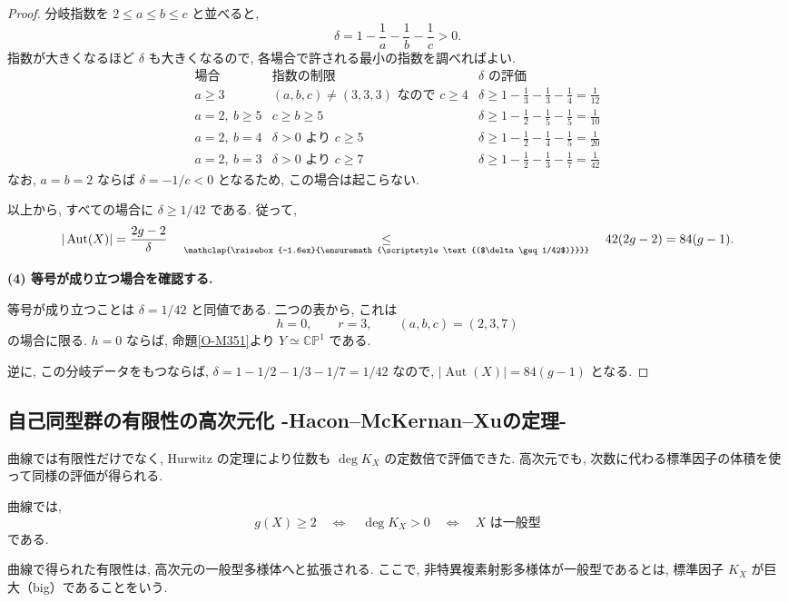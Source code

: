 \documentclass[dvipdfmx,a4paper,11pt]{article} %
\newcommand{\C}{\mathbb{C}}
\newcommand{\underalign}[2]{%
  \quad\underset{\mathclap{\raisebox{-1.6ex}{\ensuremath{\scriptstyle #1}}}}{#2}\quad
}
\theoremstyle{definition}
\numberwithin{equation}{section}
\begin{document}
\begin{proof}
分岐指数を $2\leq a\leq b\leq c$ と並べると,
\[
\delta=1-\frac1a-\frac1b-\frac1c>0.
\]
指数が大きくなるほど $\delta$ も大きくなるので,
各場合で許される最小の指数を調べればよい.
\[
\begin{array}{c|c|c}
\text{場合} & \text{指数の制限} & \delta\text{ の評価}\\ \hline
a\geq3
& (a,b,c)\neq(3,3,3)\text{ なので }c\geq4
& \displaystyle
\delta\geq1-\frac13-\frac13-\frac14=\frac1{12}\\[7pt]
a=2,\ b\geq5
& c\geq b\geq5
& \displaystyle
\delta\geq1-\frac12-\frac15-\frac15=\frac1{10}\\[7pt]
a=2,\ b=4
& \delta>0\text{ より }c\geq5
& \displaystyle
\delta\geq1-\frac12-\frac14-\frac15=\frac1{20}\\[7pt]
a=2,\ b=3
& \delta>0\text{ より }c\geq7
& \displaystyle
\delta\geq1-\frac12-\frac13-\frac17=\frac1{42}
\end{array}
\]
なお, $a=b=2$ ならば $\delta=-1/c<0$ となるため,
この場合は起こらない.

以上から, すべての場合に $\delta\geq1/42$ である.
従って,
\[
|\operatorname{Aut}(X)|
=\frac{2g-2}{\delta}
\underalign{\text{($\delta\geq1/42$)}}{\leq}
42(2g-2)=84(g-1).
\]

\medskip
\noindent
\textbf{(4) 等号が成り立つ場合を確認する.}

等号が成り立つことは $\delta=1/42$ と同値である.
二つの表から, これは
\[
h=0,\qquad r=3,\qquad (a,b,c)=(2,3,7)
\]
の場合に限る.
$h=0$ ならば, 命題\ref{O-M351}より
$Y\simeq\C\mathbb P^1$ である.

逆に, この分岐データをもつならば,
$\delta=1-1/2-1/3-1/7=1/42$ なので,
$|\operatorname{Aut}(X)|=84(g-1)$ となる.
\end{proof}


\subsection{自己同型群の有限性の高次元化 -Hacon--McKernan--Xuの定理-}
曲線では有限性だけでなく, Hurwitz の定理により位数も $\deg K_X$ の定数倍で評価できた. 高次元でも, 次数に代わる標準因子の体積を使って同様の評価が得られる.

曲線では,
\[
g(X)\geq2
\quad\Longleftrightarrow\quad
\deg K_X>0
\quad\Longleftrightarrow\quad
X\text{ は一般型}
\]
である.

曲線で得られた有限性は, 高次元の一般型多様体へと拡張される.
ここで, 非特異複素射影多様体が一般型であるとは,
標準因子 $K_X$ が巨大（big）であることをいう.
\end{document}
